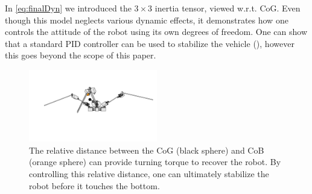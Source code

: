 In \eqref{eq:finalDyn} we introduced the $3 \times 3$ inertia tensor, viewed w.r.t. CoG. Even though this model neglects various dynamic effects, it demonstrates how one controls the attitude of the robot using its own degrees of freedom. One can show that a standard PID controller can be used to stabilize the vehicle (\cite{Haus2017}), however this goes beyond the scope of this paper.

\begin{figure}
	\centering
	\includegraphics[width=0.5\textwidth]{./img/RestoreTorque.png}
	\caption{The relative distance between the CoG (black sphere) and CoB (orange sphere) can provide turning torque to recover the robot. By controlling this relative distance, one can ultimately stabilize the robot before it touches the bottom. }
	\label{fig:RestoreTorque}
\end{figure}